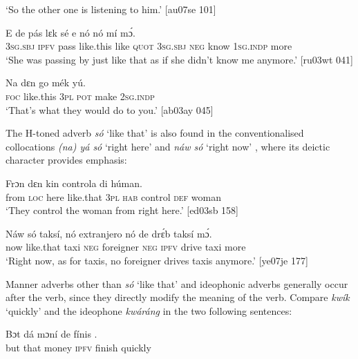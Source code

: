 \glt ‘So the other one is listening to him.’ [au07se 101]
\z


\ea%
    \label{ex:key:852}
    \gll E    de  pás      lɛk  sé    e    nó  nó    mí    mɔ́.\\
\textsc{3sg.sbj}  \textsc{ipfv}  pass  like.this  like  \textsc{quot}    \textsc{3sg.sbj}  \textsc{neg}  know  \textsc{1sg.indp}  more\\

\glt ‘She was passing by just like that as if she didn’t know me anymore.’ [ru03wt 041]
\z


\ea%
    \label{ex:key:853}
    \gll Na      dɛn  go  mék    yú.\\
\textsc{foc}  like.this  \textsc{3pl}  \textsc{pot}  make  \textsc{2sg.indp}\\

\glt ‘That’s what they would do to you.’ [ab03ay 045]
\z

The H-toned adverb \textit{só} ‘like that’ is also found in the conventionalised collocations \textit{(na) yá só} ‘right here’  and \textit{náw só} ‘right now’ , where its deictic character provides emphasis: 


\ea%
    \label{ex:key:854}
    \gll Frɔn              dɛn  kin  controla  di  húman.\\
from  \textsc{loc}  here    like.that  \textsc{3pl}  \textsc{hab}  control  \textsc{def}  woman\\

\glt ‘They control the woman from right here.’ [ed03sb 158]
\z


\ea%
    \label{ex:key:855}
    \gll Náw    só    taksí,  nó  extranjero  nó  de  drɛ́b    taksí  mɔ́.\\
now    like.that  taxi    \textsc{neg}  foreigner  \textsc{neg}  \textsc{ipfv}  drive  taxi    more\\

\glt ‘Right now, as for taxis, no foreigner drives taxis anymore.’ [ye07je 177]
\z

Manner adverbs other than \textit{só} ‘like that’ and ideophonic adverbs generally occur after the verb, since they directly modify the meaning of the verb. Compare \textit{kwík} ‘quickly’ and the ideophone \textit{kwáráng} in the two following sentences:


\ea%
    \label{ex:key:856}
    \gll Bɔt  dá  mɔní  de  fínis    .\\
but  that  money  \textsc{ipfv}  finish  quickly\\


